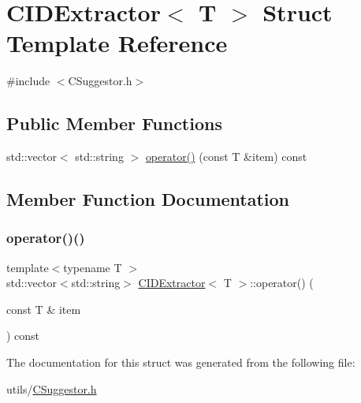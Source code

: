 \hypertarget{struct_c_i_d_extractor}{}\section{C\+I\+D\+Extractor$<$ T $>$ Struct Template Reference}
\label{struct_c_i_d_extractor}


{\ttfamily \#include $<$C\+Suggestor.\+h$>$}

\subsection*{Public Member Functions}
\begin{DoxyCompactItemize}
\item 
std\+::vector$<$ std\+::string $>$ \mbox{\hyperlink{struct_c_i_d_extractor_a1e791baeb8a514450f17117e5446df2e}{operator()}} (const T \&item) const
\end{DoxyCompactItemize}


\subsection{Member Function Documentation}
\mbox{\label{struct_c_i_d_extractor_a1e791baeb8a514450f17117e5446df2e}} 
\subsubsection{\texorpdfstring{operator()()}{operator()()}}
{\footnotesize\ttfamily template$<$typename T $>$ \\
std\+::vector$<$std\+::string$>$ \mbox{\hyperlink{struct_c_i_d_extractor}{C\+I\+D\+Extractor}}$<$ T $>$\+::operator() (\begin{DoxyParamCaption}\item[{const T \&}]{item }\end{DoxyParamCaption}) const}



The documentation for this struct was generated from the following file\+:\begin{DoxyCompactItemize}
\item 
utils/\mbox{\hyperlink{_c_suggestor_8h}{C\+Suggestor.\+h}}\end{DoxyCompactItemize}
